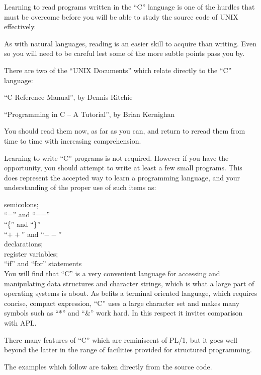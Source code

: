 %
%

Learning to read programs written in
the ``C'' language is one of the hurdles
that must be overcome before you will
be able to study the source code of
UNIX effectively.

As with natural languages, reading is
an easier skill to acquire than writing.
Even so you will need to be careful lest
some of the more subtle points pass you by.

There are two of the ``UNIX Documents''
which relate directly to the ``C''
language:

``C Reference Manual'', by Dennis Ritchie

``Programming in C -- A Tutorial'',
 by Brian Kernighan

You should read them now, as far as you
can, and return to reread them from
time to time with increasing comprehension.

Learning to write ``C'' programs is not
required. However if you have the
opportunity, you should attempt to
write at least a few small programs.
This does represent the accepted way to
learn a programming language, and your
understanding of the proper use of such
items as:

semicolons; \\
``='' and ``=='' \\
``\{'' and ``\}'' \\
``$++$'' and ``$--$'' \\
declarations; \\
register variables; \\
``if'' and ``for'' statements \\


You will find that ``C'' is a very
convenient language for accessing and
manipulating data structures and
character strings, which is what a large
part of operating systems is about. As
befits a terminal oriented language,
which requires concise, compact expression,
``C'' uses a large character set
and makes many symbols such as ``*'' and
``\&'' work hard. In this respect it
invites comparison with APL.

There many features of ``C'' which are
reminiscent of PL/1, but it goes well
beyond the latter in the range of
facilities provided for structured programming.


The examples which follow are taken
directly from the source code.

